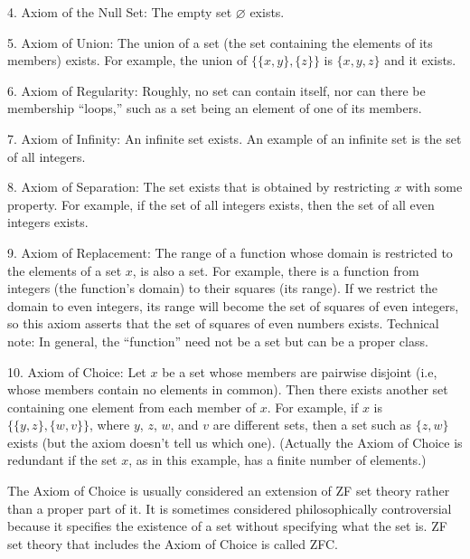 4. Axiom of the Null Set:  The empty set $\varnothing$ exists.

5. Axiom of Union:  The union of a set (the set containing the elements of
   its members) exists.  For example, the union of $\{\{x,y\},\{z\}\}$ is
 $\{x,y,z\}$ and
   it exists.

6. Axiom of Regularity:  Roughly, no set can contain itself, nor can there
   be membership ``loops,'' such as a set being an
   element of one of its members.

7. Axiom of Infinity:  An infinite set exists.  An example of an infinite
   set is the set of all
   integers.

8. Axiom of Separation:  The set exists that is obtained by restricting $x$
   with some property.  For example, if the set of all integers exists,
   then the set of all even integers exists.

9. Axiom of Replacement:  The range of a function whose domain is restricted
   to the elements of a set $x$, is also a set.  For example, there
   is a function
   from integers (the function's domain) to their squares (its
   range).  If we
   restrict the domain to even integers, its range will become the set of
   squares of even integers, so this axiom asserts that the set of
    squares of even numbers exists.  Technical note:  In general, the
   ``function'' need not be a set but can be a proper class.

10. Axiom of Choice:  Let $x$ be a set whose members are pairwise
  disjoint (i.e,
  whose members contain no elements in common).  Then there exists another
  set containing one element from each member of $x$.  For
  example, if $x$ is
  $\{\{y,z\},\{w,v\}\}$, where $y$, $z$, $w$, and $v$ are
  different sets, then a set such as $\{z,w\}$
  exists (but the axiom doesn't tell
  us which one).  (Actually the Axiom
  of Choice is redundant if the set $x$, as in this example, has a finite
  number of elements.)

The Axiom of Choice is usually considered an extension of ZF set theory rather
than a proper part of it.  It is sometimes considered philosophically
controversial because it specifies the existence of a set without specifying
what the set is.  ZF set theory that includes the Axiom of Choice is
called ZFC.

